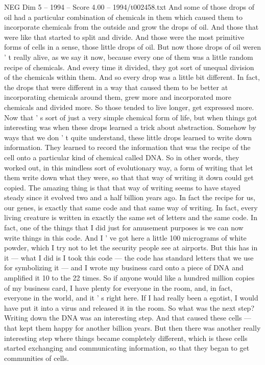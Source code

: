 \begin{textsample}{NEG Dim 5 – 1994 – Score 4.00 – 1994/t002458.txt}
And some of those drops of oil had a particular combination of chemicals in them which caused them to incorporate chemicals from the outside and grow the drops of oil.
And those that were like that started to split and divide.
And those were the most primitive forms of cells in a sense, those little drops of oil.
But now those drops of oil weren ' t really alive, as we say it now, because every one of them was a little random recipe of chemicals.
And every time it divided, they got sort of unequal division of the chemicals within them.
And so every drop was a little bit different.
In fact, the drops that were different in a way that caused them to be better at incorporating chemicals around them, grew more and incorporated more chemicals and divided more.
So those tended to live longer, get expressed more.
Now that ' s sort of just a very simple chemical form of life, but when things got interesting was when these drops learned a trick about abstraction.
Somehow by ways that we don ' t quite understand, these little drops learned to write down information.
They learned to record the information that was the recipe of the cell onto a particular kind of chemical called DNA.
So in other words, they worked out, in this mindless sort of evolutionary way, a form of writing that let them write down what they were, so that that way of writing it down could get copied.
The amazing thing is that that way of writing seems to have stayed steady since it evolved two and a half billion years ago.
In fact the recipe for us, our genes, is exactly that same code and that same way of writing.
In fact, every living creature is written in exactly the same set of letters and the same code.
In fact, one of the things that I did just for amusement purposes is we can now write things in this code.
And I ' ve got here a little 100 micrograms of white powder, which I try not to let the security people see at airports.
But this has in it — what I did is I took this code — the code has standard letters that we use for symbolizing it — and I wrote my business card onto a piece of DNA and amplified it 10 to the 22 times.
So if anyone would like a hundred million copies of my business card, I have plenty for everyone in the room, and, in fact, everyone in the world, and it ' s right here.
If I had really been a egotist, I would have put it into a virus and released it in the room.
So what was the next step?
Writing down the DNA was an interesting step.
And that caused these cells — that kept them happy for another billion years.
But then there was another really interesting step where things became completely different, which is these cells started exchanging and communicating information, so that they began to get communities of cells.

\end{textsample}
